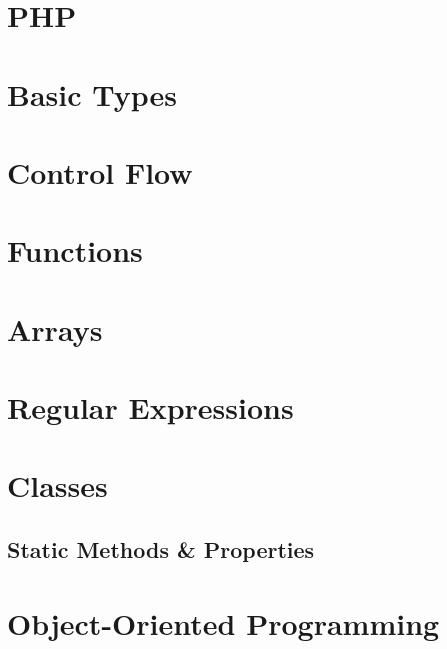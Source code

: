 \documentclass[b5paper,openany]{book}
\begin{document}
\tp


\tableofcontents



\chapter{PHP}


\chapter{Basic Types}


\chapter{Control Flow}


\chapter{Functions}


\chapter{Arrays}


\chapter{Regular Expressions}


\chapter{Classes}


\begin{readonly}
    \chapter{Static Methods \& Properties}
    
\end{readonly}

\chapter{Object-Oriented Programming}

\end{document}

